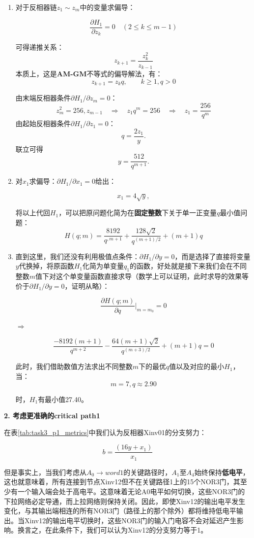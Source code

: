 \documentclass[UTF8,12pt,a4paper]{ctexart}
\begin{document}
\begin{enumerate}
    \item 对于反相器链$z_1 \sim z_m$中的变量求偏导：
    
    $$\frac{\partial H_1}{\partial z_k}=0\quad (2\le k\le m-1)$$

    可得递推关系：
    \[
    z_{k+1}=\frac{z_k^2}{z_{k-1}}
    \]
    本质上，这是\textbf{AM-GM}不等式的偏导解法，有：
    \[
    z_{k+1} = z_{k}q, \qquad k \geq 1, q>0
    \]

    由末端反相器条件$\partial H_1/\partial z_m=0$：
    \[
    z_m^2 = 256, z_{m-1}\quad\Rightarrow\quad z_1 q^{m}=256 \quad\Rightarrow\quad z_1=\frac{256}{q^{m}}
    \]
    由起始反相器条件$\partial H_1/\partial z_1=0$：
    \[
    q=\frac{2z_1}{y}.
    \]
    联立可得
    \[
    y=\frac{512}{q^{m+1}}.
    \]

    \item 对$x_1$求偏导：$\partial H_1/\partial x_1=0$给出：
    
    \[
    x_1=4\sqrt{y},
    \]

    将以上代回$H_1$，可以把原问题化简为在\textbf{固定整数}下关于单一正变量$q$最小值问题：
    \[
    H(q;m)=\frac{8192}{q^{,m+1}}+\frac{128\sqrt{2}}{q^{(m+1)/2}}+(m+1)q
    \]

    \item 直到这里，我们还没有利用极值点条件：$\partial H_1/\partial y=0$，而是选择了直接将变量$y$代换掉，将原函数$H_1$化简为单变量$q_1$的函数，好处就是接下来我们会在不同整数$m$值下对这个单变量函数直接求导（数学上可以证明，此时求导的效果等价于$\partial H_1/\partial y=0$，证明从略）：

    $$\frac{\partial H(q;m)}{\partial q}\bigg|_{m=m_0}=0$$

    $\Rightarrow$

    $$\frac{-8192(m+1)}{q^{m+2}} - \frac{64(m+1)\sqrt{2}}{q^{(m+3)/2}} + (m+1)q = 0$$

    此时，我们借助数值方法求出不同整数$m$下的最优$q$值以及对应的最小$H_1$，当：
    $$m = 7, q \approx 2.90$$

    时，$H_{\text{1}}$有最小值27.40。
\end{enumerate}

\textbf{2. 考虑更准确的critical path1}

在表\ref{tab:task3_p1_metrics}中我们认为反相器Xinv01的分支努力：

$$b = \frac{(16y+x_1)}{x_1}$$

但是事实上，当我们考虑从$A_0 \rightarrow word1$的关键路径时，$A_1$至$A_4$始终保持\textbf{低电平}，这也就意味着，所有连接到节点Xinv12但不在关键路径1上的15个NOR3门，其至少有一个输入端会处于高电平。这意味着无论A0电平如何切换，这些NOR3门的下拉网络必定导通，而上拉网络则保持关闭。因此，即使Xinv12的输出电平发生变化，与其输出端相连的所有NOR3门（路径上的那个除外）都将维持低电平输出。当Xinv12的输出电平切换时，这些NOR3门的输入门电容不会对延迟产生影响。换言之，在此条件下，我们可以认为Xinv12的分支努力等于1。
\end{document}
